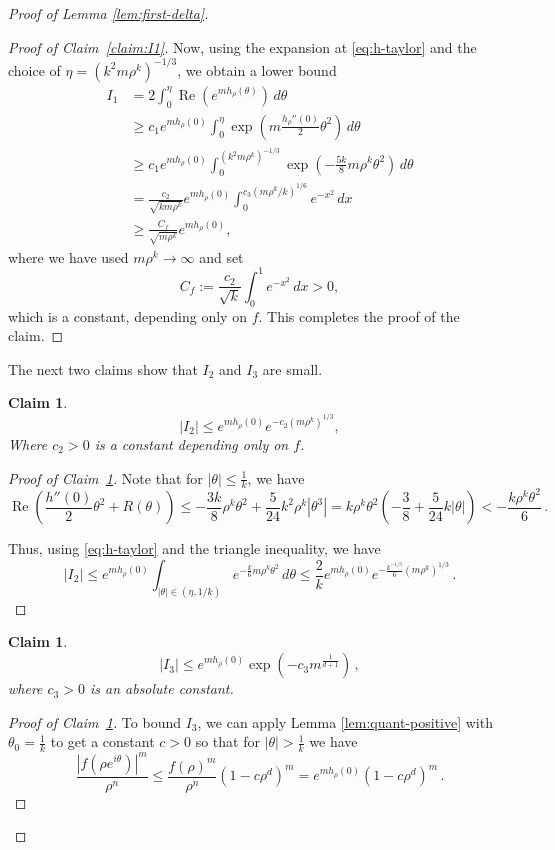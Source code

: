 \documentclass{daj}
\renewcommand{\Re}{\operatorname{Re}}
\def\eit{e^{i\theta}}
\newtheorem{claim}[theorem]{Claim}
\theoremstyle{definition}
\theoremstyle{remark}
\begin{document}
\begin{proof}[Proof of Lemma \ref{lem:first-delta}]
\begin{proof}[{Proof of Claim~\ref{claim:I1}}]
	Now, using the expansion at \eqref{eq:h-taylor} and the choice of $\eta= (k^2 m \rho^k)^{-1/3}$, we obtain a lower bound\begin{align*}
	I_1  &= 2 \int_0^\eta \Re (e^{m h_\rho(\theta)})\,d\theta \\
	&\geq c_1 e^{m h_\rho(0)} \int_0^\eta \exp\left({m \frac{h_\rho''(0)}{2}\theta^2 } \right)\,d\theta \\
	&\geq c_1 e^{m h_\rho(0)} \int_0^{(k^2 m \rho^k)^{-1/3}} \exp\left(- \frac{5k}{8} m \rho^k \theta^2 \right)\,d\theta \\
	&= \frac{c_2}{\sqrt{k m \rho^k }} e^{mh_\rho(0)} \int_0^{c_3( m \rho^k / k )^{1/6}} e^{-x^2} \,dx \\
	&\geq \frac{C_f}{\sqrt{m \rho^k}} e^{m h_\rho(0)},
	\end{align*}
	where we have used $m \rho^k \to \infty$ and set 
	\[ C_f := \frac{c_2}{\sqrt{k}} \int_0^1 e^{-x^2}\,dx >0,\]
	which is a constant, depending only on $f$. This completes the proof of the claim. 
\end{proof}
	
The next two claims show that $I_2$ and $I_3$ are small. 	

\begin{claim}\label{claim:I2}
\[|I_2| \leq e^{m h_{\rho}(0)} e^{-c_2(m\rho^k)^{1/3}}, \]
Where $c_2>0$ is a constant depending only on $f$.
\end{claim}
\begin{proof}[Proof of Claim~\ref{claim:I2}]  Note that for $|\theta| \leq \frac{1}{k}$, we have 
	$$\Re\left(\frac{h''(0)}{2} \theta^2 + R(\theta)\right) \leq -\frac{3k}{8}\rho^k \theta^2 + \frac{5}{24} k^2 \rho^k|\theta^3| = k \rho^k \theta^2 \left(-\frac{3}{8} + \frac{5}{24}k|\theta| \right) < - \frac{k \rho^k \theta^2}{6}\,. $$
	
Thus, using \eqref{eq:h-taylor} and the triangle inequality, we have $$\left|I_2 \right| \leq e^{mh_\rho(0)}\int_{|\theta| \in (\eta,1/k)}  e^{-\frac{k}{6} m \rho^k \theta^2 }\,d\theta \leq \frac{2}{k} e^{m h_\rho(0)} e^{-\frac{k^{-1/3}}{6}(m\rho^k)^{1/3}}\,.$$\end{proof}
	
	
	\begin{claim}\label{claim:I3}
	$$|I_3| \leq e^{m h_\rho(0)} \exp\left(-c_3 m^{\frac{1}{d+1}} \right)\,, $$ where $c_3 >0$ is an absolute constant.
	\end{claim}
\begin{proof}[Proof of Claim~\ref{claim:I3}]
	To bound $I_3$, we can apply Lemma \ref{lem:quant-positive} with $\theta_0 = \frac{1}{k}$ to get a constant $c > 0$ so that for $|\theta| > \frac{1}{k}$ we have $$\frac{|f(\rho \eit)|^m}{\rho^n} \leq \frac{f(\rho)^m}{\rho^n}(1 - c \rho^d)^m = e^{mh_\rho(0)} (1 - c\rho^d)^m\,.$$
	

\end{proof}
\end{proof}
\end{document}
